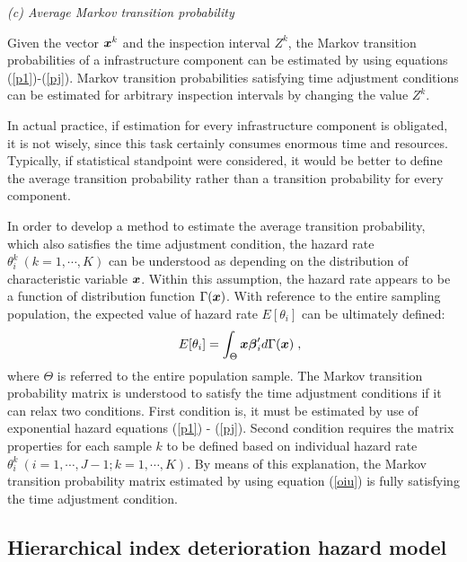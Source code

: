 \textit{(c) Average Markov transition probability}

Given the vector $\mbox{\boldmath$x$}^k$ and the inspection interval $Z^k$, the Markov transition probabilities of a infrastructure component can be estimated by using equations (\ref{p1})-(\ref{pj}). Markov transition probabilities satisfying time adjustment conditions can be estimated for arbitrary inspection intervals by changing the value $Z^k$. 

In actual practice, if estimation for every infrastructure component is obligated, it is not wisely, since this task certainly consumes enormous time and resources. Typically, if statistical standpoint were considered, it would be better to define the average transition probability rather than a transition probability for every component.

In order to develop a method to estimate the average transition probability, which also satisfies the time adjustment condition, the hazard rate $\theta_i^k~(k=1,\cdots,K)$ can be understood as depending on the distribution of characteristic variable $\mbox{\boldmath$x$}$. Within this assumption, the hazard rate appears to be a function of distribution function $\Gamma(\mbox{\boldmath$x$})$. With reference to the entire sampling population, the expected value of hazard rate $E[\theta_i]$ can be ultimately defined:
\begin{eqnarray}
&& E[\theta_i]=\int_{\Theta} \mbox{\boldmath$x$}\mbox{\boldmath$\beta$}_i^\prime d\Gamma(\mbox{\boldmath$x$})\hspace{1mm},\label{oiu}
\end{eqnarray}
where $\Theta$ is referred to the entire population sample. The Markov transition probability matrix is understood to satisfy the time adjustment conditions if it can relax two conditions. First condition is, it must be estimated by use of exponential hazard equations (\ref{p1}) - (\ref{pj}). Second condition requires the matrix properties for each sample $k$ to be defined based on individual hazard rate  $\theta_i^k~(i=1,\cdots,J-1;k=1,\cdots,K)$. By means of this explanation, the Markov transition probability matrix estimated by using equation (\ref{oiu}) is fully satisfying the time adjustment condition.
\subsection{Hierarchical index deterioration hazard model}
\label{242}
